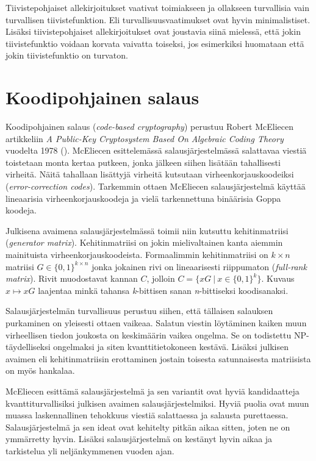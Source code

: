 Tiivistepohjaiset allekirjoitukset vaativat toimiakseen ja ollakseen turvallisia vain turvallisen tiivistefunktion. Eli turvallisuusvaatimukset ovat hyvin minimalistiset. Lisäksi tiivistepohjaiset allekirjoitukset ovat joustavia siinä mielessä, että jokin tiivistefunktio voidaan korvata vaivatta toiseksi, jos esimerkiksi huomataan että jokin tiivistefunktio on turvaton.

\section{Koodipohjainen salaus}
Koodipohjainen salaus (\emph{code-based cryptography}) perustuu Robert McEliecen artikkeliin \emph{A Public-Key Cryptosystem Based On Algebraic Coding Theory} vuodelta 1978 (\cite{8012331}). McEliecen esittelemässä salausjärjestelmässä salattavaa viestiä toistetaan monta kertaa putkeen, jonka jälkeen siihen lisätään tahallisesti virheitä. Näitä tahallaan lisättyjä virheitä kutsutaan virheenkorjauskoodeiksi (\emph{error-correction codes}). Tarkemmin ottaen McEliecen salausjärjestelmä käyttää lineaarisia virheenkorjauskoodeja ja vielä tarkennettuna binäärisia Goppa koodeja.

Julkisena avaimena salausjärjestelmässä toimii niin kutsuttu kehitinmatriisi (\emph{generator matrix}). Kehitinmatriisi on jokin mielivaltainen kanta aiemmin mainituista virheenkorjauskoodeista. Formaalimmin kehitinmatriisi on $k \times n$ matriisi $G \in \big\{0,1\big\}^{k \times n}$ jonka jokainen rivi on lineaarisesti riippumaton (\emph{full-rank matrix}). Rivit muodostavat kannan $C$, jolloin $C = \big\{ xG \: | \: x \in \big\{0,1\big\}^k \big\}$. Kuvaus $x \mapsto xG$ laajentaa minkä tahansa \emph{k}-bittisen sanan \emph{n}-bittiseksi koodisanaksi.

Salausjärjestelmän turvallisuus perustuu siihen, että tällaisen salauksen purkaminen on yleisesti ottaen vaikeaa. Salatun viestin löytäminen kaiken muun virheellisen tiedon joukosta on keskimäärin vaikea ongelma. Se on todistettu NP-täydelliseksi ongelmaksi ja siten kvanttitietokoneen kestävä. Lisäksi julkisen avaimen eli kehitinmatriisin erottaminen jostain toisesta satunnaisesta matriisista on myös hankalaa.

McEliecen esittämä salausjärjestelmä ja sen variantit ovat hyviä kandidaatteja kvanttiturvallisiksi julkisen avaimen salausjärjestelmiksi. Hyviä puolia ovat muun muassa laskennallinen tehokkuus viestiä salattaessa ja salausta purettaessa. Salausjärjestelmä ja sen ideat ovat kehitelty pitkän aikaa sitten, joten ne on ymmärretty hyvin. Lisäksi salausjärjestelmä on kestänyt hyvin aikaa ja tarkistelua yli neljänkymmenen vuoden ajan.

